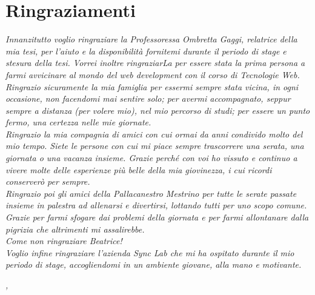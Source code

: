
\cleardoublepage
{}
{}

\bigskip

\begingroup
\let\clearpage\relax
\let\cleardoublepage\relax
\let\cleardoublepage\relax

\chapter*{Ringraziamenti}

\noindent \textit{Innanzitutto voglio ringraziare la Professoressa Ombretta Gaggi, relatrice della mia tesi, per l'aiuto e la disponibilità fornitemi durante il periodo di stage e stesura della tesi. Vorrei inoltre ringraziarLa per essere stata la prima persona a farmi avvicinare al mondo del web development con il corso di Tecnologie Web. }\\

\noindent \textit{Ringrazio sicuramente la mia famiglia per essermi sempre stata vicina, in ogni occasione, non facendomi mai sentire solo; per avermi accompagnato, seppur sempre a distanza (per volere mio), nel mio percorso di studi; per essere un punto fermo, una certezza nelle mie giornate.}\\

\noindent \textit{Ringrazio la mia compagnia di amici con cui ormai da anni condivido molto del mio tempo. Siete le persone con cui mi piace sempre trascorrere una serata, una giornata o una vacanza insieme. Grazie perché con voi ho vissuto e continuo a vivere molte delle esperienze più belle della mia giovinezza, i cui ricordi conserverò per sempre.}\\

\noindent \textit{Ringrazio poi gli amici della Pallacanestro Mestrino per tutte le serate passate insieme in palestra ad allenarsi e divertirsi, lottando tutti per uno scopo comune. Grazie per farmi sfogare dai problemi della giornata e per farmi allontanare dalla pigrizia che altrimenti mi assalirebbe.}\\

\noindent \textit{Come non ringraziare Beatrice!}\\

\noindent \textit{Voglio infine ringraziare l'azienda Sync Lab che mi ha ospitato durante il mio periodo di stage, accogliendomi in un ambiente giovane, alla mano e motivante.}\\
\bigskip

\noindent\textit{\myLocation, \myTime}
\hfill \myName

\endgroup

